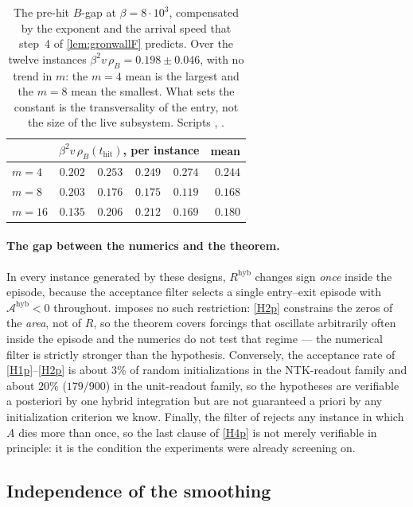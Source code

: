 \documentclass[11pt]{article}
\theoremstyle{definition}
\theoremstyle{remark}
\newcommand{\thit}{t_{\mathrm{hit}}}
\newcommand{\Ar}{\mathcal{A}}                      %
\newcommand{\hyb}{\mathrm{hyb}}
\begin{document}
\begin{table}[t]
\centering
\caption{The pre-hit $B$-gap at $\beta=8\cdot10^3$, compensated by the exponent
and the arrival speed that step~4 of \cref{lem:gronwallF} predicts. Over the
twelve instances $\beta^2v\,\rho_B=0.198\pm0.046$, with no trend in $m$: the
$m=4$ mean is the largest and the $m=8$ mean the smallest. What sets the
constant is the transversality of the entry, not the size of the live
subsystem. Scripts \protect{},
\protect{}.}
\label{tab:o5}
\begin{tabular}{@{}lccccr@{}}
\toprule
& \multicolumn{4}{c}{$\beta^2 v\,\rho_B(\thit)$, per instance} & mean\\
\midrule
$m=4$  & $0.202$ & $0.253$ & $0.249$ & $0.274$ & $0.244$\\
$m=8$  & $0.203$ & $0.176$ & $0.175$ & $0.119$ & $0.168$\\
$m=16$ & $0.135$ & $0.206$ & $0.212$ & $0.169$ & $0.180$\\
\bottomrule
\end{tabular}
\end{table}

\paragraph{The gap between the numerics and the theorem.} In every instance
generated by these designs, $R^{\hyb}$ changes sign \emph{once} inside the
episode, because the acceptance filter selects a single entry--exit episode with
$\Ar^{\hyb}<0$ throughout.  imposes no such restriction:
\eqref{H2p} constrains the zeros of the \emph{area}, not of $R$, so the theorem
covers forcings that oscillate arbitrarily often inside the episode and the
numerics do not test that regime --- the numerical filter is strictly stronger
than the hypothesis. Conversely, the acceptance rate of \eqref{H1p}--\eqref{H2p} is about $3\%$ of
random initializations in the NTK-readout family and about $20\%$ ($179/900$)
in the unit-readout family, so the hypotheses are
verifiable a posteriori by one hybrid integration but are not guaranteed a
priori by any initialization criterion we know. Finally, the filter of
 rejects any instance in which $A$ dies more than
once, so the last clause of \eqref{H4p} is not merely verifiable in principle: it is
the condition the experiments were already screening on.

\subsection{Independence of the smoothing}\label{sec:regularization}
\end{document}
